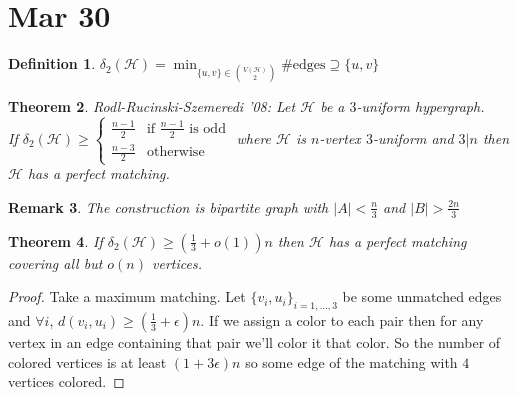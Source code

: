 \documentclass[a4paper]{article}
\newtheorem{thm}{Theorem}[section]
\newtheorem{defn}[thm]{Definition}
\newtheorem{rmk}[thm]{Remark}
\begin{document}
\section{Mar 30}
\begin{defn}
    $\delta_2(\mathcal{H})=\min_{ \{u,v\}\in {V(\mathcal{H}) \choose 2}} \# \text{edges} \supseteq \{u,v\}$
\end{defn}
\begin{thm}
    Rodl-Rucinski-Szemeredi '08: Let $\mathcal{H}$ be a $3$-uniform hypergraph. \\
    If $\delta_2(\mathcal{H})\geq \begin{cases}
        \frac{n-1}{2} & \text{if $\frac{n-1}{2}$ is odd} \\
        \frac{n-3}{2} & \text{otherwise} 
    \end{cases}$ 
    where $\mathcal{H}$ is $n$-vertex $3$-uniform and $3|n$ then $\mathcal{H}$ has a perfect matching. 
\end{thm}
\begin{rmk}
    The construction is bipartite graph with $|A|<\frac{n}{3}$ and $|B|> \frac{2n}{3}$
\end{rmk}
\begin{thm}
    If $\delta_2(\mathcal{H})\geq  \left( \frac{1}{3}+o(1) \right)n$ then $\mathcal{H}$ has a perfect matching covering all but $o(n)$ vertices. 
\end{thm}
\begin{proof}
    Take a maximum matching. Let $ \{v_i,u_i\}_{i=1,...,3}$ be some unmatched edges and $\forall i$, $d(v_i,u_i)\geq  \left( \frac{1}{3}+\epsilon \right)n$. If we assign a color to each pair then for any vertex in an edge containing that pair we'll color it that color. So the number of colored vertices is at least $(1+3\epsilon)n$ so some edge of the matching with $4$ vertices colored.  
\end{proof}
\newpage
\end{document}
